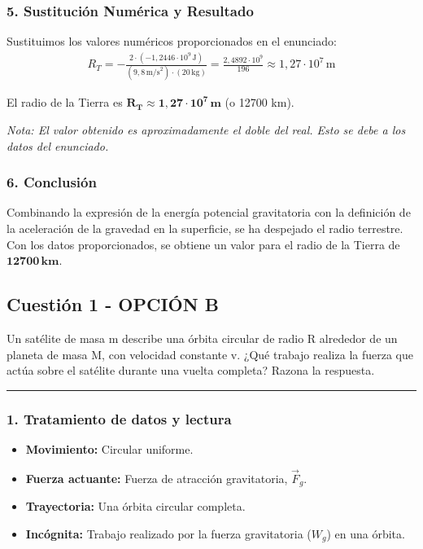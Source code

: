 \subsubsection*{5. Sustitución Numérica y Resultado}
Sustituimos los valores numéricos proporcionados en el enunciado:
\begin{gather}
    R_T = - \frac{2 \cdot (-1,2446 \cdot 10^9 \, \text{J})}{(9,8 \, \text{m/s}^2) \cdot (20 \, \text{kg})} = \frac{2,4892 \cdot 10^9}{196} \approx 1,27 \cdot 10^7 \, \text{m}
\end{gather}
\begin{cajaresultado}
    El radio de la Tierra es $\boldsymbol{R_T \approx 1,27 \cdot 10^7 \, \textbf{m}}$ (o 12700 km).
\end{cajaresultado}
\textit{Nota: El valor obtenido es aproximadamente el doble del real. Esto se debe a los datos del enunciado.}

\subsubsection*{6. Conclusión}
\begin{cajaconclusion}
    Combinando la expresión de la energía potencial gravitatoria con la definición de la aceleración de la gravedad en la superficie, se ha despejado el radio terrestre. Con los datos proporcionados, se obtiene un valor para el radio de la Tierra de $\mathbf{12700 \, km}$.
\end{cajaconclusion}

\newpage

\subsection{Cuestión 1 - OPCIÓN B}
\label{subsec:1B_2005_jun_cv}

\begin{cajaenunciado}
Un satélite de masa m describe una órbita circular de radio R alrededor de un planeta de masa M, con velocidad constante v. ¿Qué trabajo realiza la fuerza que actúa sobre el satélite durante una vuelta completa? Razona la respuesta.
\end{cajaenunciado}
\hrule

\subsubsection*{1. Tratamiento de datos y lectura}
\begin{itemize}
    \item \textbf{Movimiento:} Circular uniforme.
    \item \textbf{Fuerza actuante:} Fuerza de atracción gravitatoria, $\vec{F}_g$.
    \item \textbf{Trayectoria:} Una órbita circular completa.
    \item \textbf{Incógnita:} Trabajo realizado por la fuerza gravitatoria ($W_g$) en una órbita.
\end{itemize}

